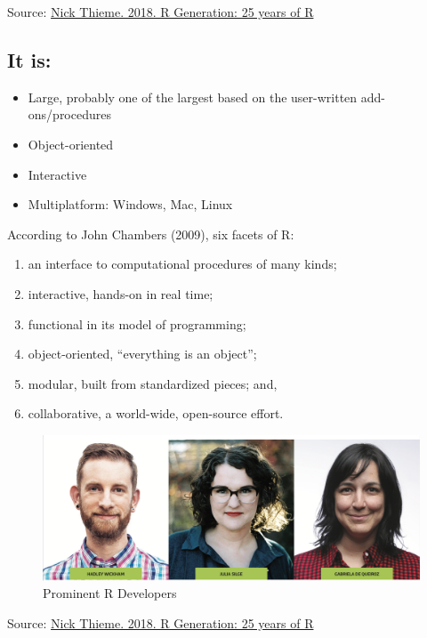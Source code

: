 \documentclass[]{book}
\providecommand{\tightlist}{%
  \setlength{\itemsep}{0pt}\setlength{\parskip}{0pt}}
\begin{document}
Source: \href{https://rss.onlinelibrary.wiley.com/doi/10.1111/j.1740-9713.2018.01169.x}{Nick Thieme. 2018. R Generation: 25 years of R}

\hypertarget{it-is}{%
\subsection{It is:}\label{it-is}}

\begin{itemize}
\tightlist
\item
  Large, probably one of the largest based on the user-written add-ons/procedures
\item
  Object-oriented
\item
  Interactive
\item
  Multiplatform: Windows, Mac, Linux
\end{itemize}

According to John Chambers (2009), six facets of R:

\begin{enumerate}
\def\labelenumi{\arabic{enumi}.}
\tightlist
\item
  an interface to computational procedures of many kinds;
\item
  interactive, hands-on in real time;
\item
  functional in its model of programming;
\item
  object-oriented, ``everything is an object'';
\item
  modular, built from standardized pieces; and,
\item
  collaborative, a world-wide, open-source effort.
\end{enumerate}

\begin{figure}
\includegraphics[width=1\linewidth]{Rdevelopers} \caption{Prominent R Developers}\label{fig:Rdevelopers}
\end{figure}

Source: \href{https://rss.onlinelibrary.wiley.com/doi/10.1111/j.1740-9713.2018.01169.x}{Nick Thieme. 2018. R Generation: 25 years of R}
\end{document}
